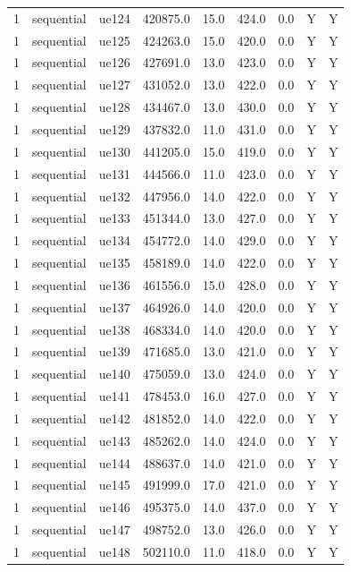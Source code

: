 \begin{table}[ht]
\begin{tabular}{|c|c|c|c|c|c|c|c|c|}
1 & sequential & ue124 & 420875.0 & 15.0 & 424.0 & 0.0 & Y & Y \\
1 & sequential & ue125 & 424263.0 & 15.0 & 420.0 & 0.0 & Y & Y \\
1 & sequential & ue126 & 427691.0 & 13.0 & 423.0 & 0.0 & Y & Y \\
1 & sequential & ue127 & 431052.0 & 13.0 & 422.0 & 0.0 & Y & Y \\
1 & sequential & ue128 & 434467.0 & 13.0 & 430.0 & 0.0 & Y & Y \\
1 & sequential & ue129 & 437832.0 & 11.0 & 431.0 & 0.0 & Y & Y \\
1 & sequential & ue130 & 441205.0 & 15.0 & 419.0 & 0.0 & Y & Y \\
1 & sequential & ue131 & 444566.0 & 11.0 & 423.0 & 0.0 & Y & Y \\
1 & sequential & ue132 & 447956.0 & 14.0 & 422.0 & 0.0 & Y & Y \\
1 & sequential & ue133 & 451344.0 & 13.0 & 427.0 & 0.0 & Y & Y \\
1 & sequential & ue134 & 454772.0 & 14.0 & 429.0 & 0.0 & Y & Y \\
1 & sequential & ue135 & 458189.0 & 14.0 & 422.0 & 0.0 & Y & Y \\
1 & sequential & ue136 & 461556.0 & 15.0 & 428.0 & 0.0 & Y & Y \\
1 & sequential & ue137 & 464926.0 & 14.0 & 420.0 & 0.0 & Y & Y \\
1 & sequential & ue138 & 468334.0 & 14.0 & 420.0 & 0.0 & Y & Y \\
1 & sequential & ue139 & 471685.0 & 13.0 & 421.0 & 0.0 & Y & Y \\
1 & sequential & ue140 & 475059.0 & 13.0 & 424.0 & 0.0 & Y & Y \\
1 & sequential & ue141 & 478453.0 & 16.0 & 427.0 & 0.0 & Y & Y \\
1 & sequential & ue142 & 481852.0 & 14.0 & 422.0 & 0.0 & Y & Y \\
1 & sequential & ue143 & 485262.0 & 14.0 & 424.0 & 0.0 & Y & Y \\
1 & sequential & ue144 & 488637.0 & 14.0 & 421.0 & 0.0 & Y & Y \\
1 & sequential & ue145 & 491999.0 & 17.0 & 421.0 & 0.0 & Y & Y \\
1 & sequential & ue146 & 495375.0 & 14.0 & 437.0 & 0.0 & Y & Y \\
1 & sequential & ue147 & 498752.0 & 13.0 & 426.0 & 0.0 & Y & Y \\
1 & sequential & ue148 & 502110.0 & 11.0 & 418.0 & 0.0 & Y & Y \\

\end{tabular}
\end{table}

